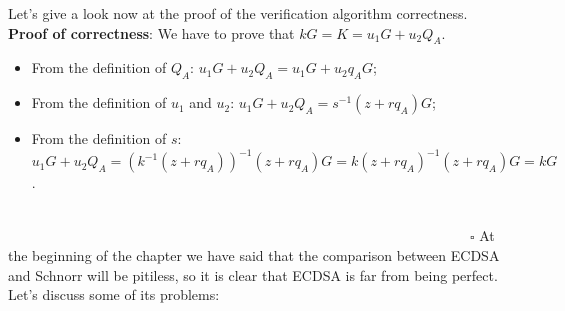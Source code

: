 \bigskip
\noindent
Let's give a look now at the proof of the verification algorithm correctness.
\\
{\bf Proof of correctness}: We have to prove that $kG = K = u_1G + u_2Q_A$.
\begin{itemize}
	\item From the definition of $Q_A$: $u_1G + u_2Q_A = u_1G + u_2q_AG$;
	\item From the definition of $u_1$ and $u_2$: $u_1G + u_2Q_A = s^{-1}(z + rq_A)G$;
	\item From the definition of $s$: $u_1G + u_2Q_A = (k^{-1}(z + rq_A))^{-1}(z + rq_A)G = k(z + rq_A)^{-1}(z + rq_A)G = kG$.
\end{itemize}
\ \ \ \ \ \ \ \ \ \ \ \ \ \ \ \ \ \ \ \ \ \ \ \ \ \ \ \ \ \ \ \ \ \ \ \ \ \ \ \ \ \ \ \ \ \ \ \ \ \ \ \ \ \ \ \ \ \ \ \ \ \ \ \ \ \ \ \ \ \ \ \ \ \ \ \ \ \ \ \ \ \ \ \ \ \ \ \ \ \ \ \ \ \ \ \ \ \ \ \ \ \ \ \ \ \ \ \ \ \ \ \ \ \ \ \ \ \ \ \ \ \ \ \ \ \ \ \ \ \ \ \ \ \ \ \ \ \ $\square$
At the beginning of the chapter we have said that the comparison between ECDSA and Schnorr will be pitiless, so it is clear that ECDSA is far from being perfect. Let's discuss some of its problems:
